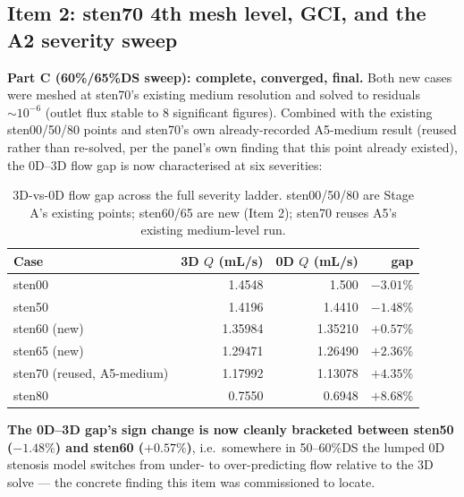 \documentclass[11pt]{article}
\begin{document}
\subsection{Item 2: sten70 4th mesh level, GCI, and the A2 severity sweep}
\label{sec:item2}
\textbf{Part C (60\%/65\%DS sweep): complete, converged, final.} Both new cases were meshed at sten70's
existing medium resolution and solved to residuals $\sim 10^{-6}$ (outlet flux stable to 8 significant
figures). Combined with the existing sten00/50/80 points and sten70's own already-recorded A5-medium
result (reused rather than re-solved, per the panel's own finding that this point already existed),
the 0D--3D flow gap is now characterised at six severities:

\begin{table}[H]
\centering
\caption{3D-vs-0D flow gap across the full severity ladder. sten00/50/80 are Stage A's existing points;
sten60/65 are new (Item 2); sten70 reuses A5's existing medium-level run.}
\begin{tabular}{lrrr}
\toprule
Case & 3D $Q$ (mL/s) & 0D $Q$ (mL/s) & gap \\
\midrule
sten00 & 1.4548 & 1.500 & $-3.01\%$ \\
sten50 & 1.4196 & 1.4410 & $-1.48\%$ \\
sten60 (new) & 1.35984 & 1.35210 & $+0.57\%$ \\
sten65 (new) & 1.29471 & 1.26490 & $+2.36\%$ \\
sten70 (reused, A5-medium) & 1.17992 & 1.13078 & $+4.35\%$ \\
sten80 & 0.7550 & 0.6948 & $+8.68\%$ \\
\bottomrule
\end{tabular}
\end{table}

\textbf{The 0D--3D gap's sign change is now cleanly bracketed between sten50 ($-1.48\%$) and sten60
($+0.57\%$)}, i.e.\ somewhere in 50--60\%DS the lumped 0D stenosis model switches from under- to
over-predicting flow relative to the 3D solve --- the concrete finding this item was commissioned to
locate.
\end{document}
